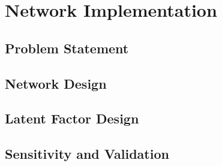 
\chapter{Network Implementation}
\label{ch:implement}

\section{Problem Statement}
\label{sec:prob}

\section{Network Design}
\label{sec:networkd}

\section{Latent Factor Design}
\label{sec:factord}

\section{Sensitivity and Validation}
\label{sec:valid}